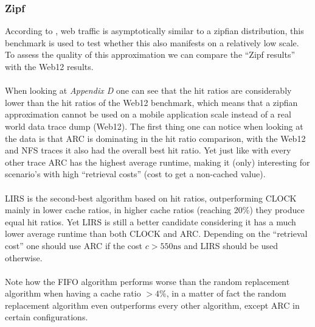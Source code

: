 \documentclass[pdftex,a4paper,12pt,twoside]{report}
\begin{document}
\subsubsection{Zipf}
According to \cite{breslau1999web}, web traffic is asymptotically similar to a zipfian distribution, this benchmark is used to test whether this also manifests on a relatively low scale. To assess the quality of this approximation we can compare the ``Zipf results'' with the Web12 results.
\\\\
When looking at \emph{Appendix D} one can see that the hit ratios are considerably lower than the hit ratios of the Web12 benchmark, which means that a zipfian approximation cannot be used on a mobile application scale instead of a real world data trace dump (Web12). The first thing one can notice when looking at the data is that ARC is dominating in the hit ratio comparison, with the Web12 and NFS traces it also had the overall best hit ratio. Yet just like with every other trace ARC has the highest average runtime, making it (only) interesting for scenario's with high ``retrieval costs'' (cost to get a non-cached value).
\\\\
LIRS is the second-best algorithm based on hit ratios, outperforming CLOCK mainly in lower cache ratios, in higher cache ratios (reaching 20\%) they produce equal hit ratios. Yet LIRS is still a better candidate considering it has a much lower average runtime than both CLOCK and ARC. Depending on the ``retrieval cost'' one should use ARC if the cost $c > 550\text{ns}$ and LIRS should be used otherwise.
\\\\
Note how the FIFO algorithm performs worse than the random replacement algorithm when having a cache ratio $> 4\%$, in a matter of fact the random replacement algorithm even outperforms every other algorithm, except ARC in certain configurations.
\end{document}
